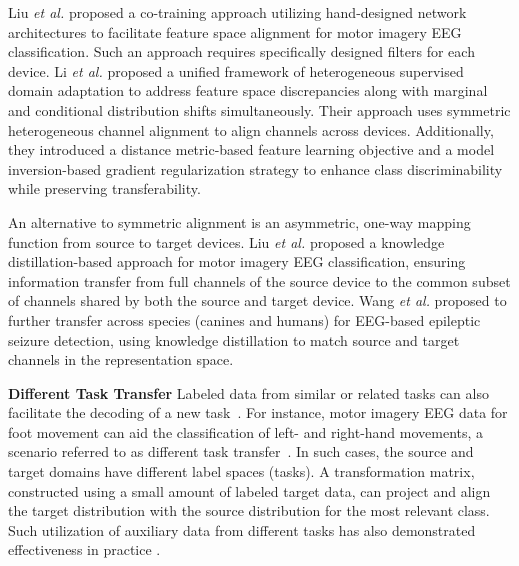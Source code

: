 \documentclass[journal]{IEEEtran}
\begin{document}
Liu \emph{et al.} \cite{Liu2024a} proposed a co-training approach utilizing hand-designed network architectures to facilitate feature space alignment for motor imagery EEG classification. Such an approach requires specifically designed filters for each device. Li \emph{et al.} \cite{Li2025HSDA}  proposed a unified framework of heterogeneous supervised domain adaptation to address feature space discrepancies along with marginal and conditional distribution shifts simultaneously. Their approach uses symmetric heterogeneous channel alignment to align channels across devices. Additionally, they introduced a distance metric-based feature learning objective and a model inversion-based gradient regularization strategy to enhance class discriminability while preserving transferability.

An alternative to symmetric alignment is an asymmetric, one-way mapping function from source to target devices. Liu \emph{et al.} \cite{Liu2025} proposed a knowledge distillation-based approach for motor imagery EEG classification, ensuring information transfer from full channels of the source device to the common subset of channels shared by both the source and target device. Wang \emph{et al.} \cite{Wang2025} proposed to further transfer across species (canines and humans) for EEG-based epileptic seizure detection, using knowledge distillation to match source and target channels in the representation space.

\textbf{Different Task Transfer} Labeled data from similar or related tasks can also facilitate the decoding of a new task~\cite{Wu2022a}. For instance, motor imagery EEG data for foot movement can aid the classification of left- and right-hand movements, a scenario referred to as different task transfer~\cite{He2020LA}. In such cases, the source and target domains have different label spaces (tasks). A transformation matrix, constructed using a small amount of labeled target data, can project and align the target distribution with the source distribution for the most relevant class. Such utilization of auxiliary data from different tasks has also demonstrated effectiveness in practice \cite{Vishwanath2022}.
\end{document}
